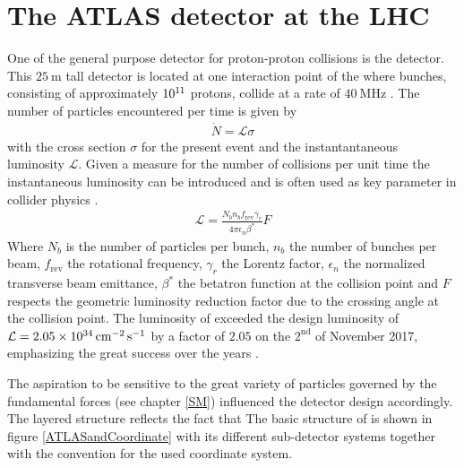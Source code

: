 \section{The ATLAS detector at the LHC}\label{ATLAS}
One of the general purpose detector for proton-proton collisions is the {\ATLAS} detector. This $\SI{25}{\meter}$ tall detector is located at one interaction point of the {\LHC} where bunches, consisting of approximately $\SI{E11}{}$ protons, collide at a rate of $\SI{40}{\mega\hertz}$ \cite{ATLASJINST}. The number of particles encountered per time is given by \cite{Perkins}
\begin{align}
                        \dot{N}=\mathcal{L}\sigma
\end{align}
with the cross section $\sigma$ for the present event and the instantantaneous luminosity $\mathcal{L}$. Given a measure for the number of collisions per unit time the instantaneous luminosity can be introduced and is often used as key parameter in collider physics \cite{LHCJINST}.
\begin{align}
                        \mathcal{L}=\frac{N_bn_bf_{\text{rev}}\gamma_r}{4\pi\epsilon_n\beta^*}F
\label{Lumi}
\end{align}
Where $N_b$ is the number of particles per bunch, $n_b$ the number of bunches per beam, $f_{\text{rev}}$ the rotational frequency, $\gamma_r$ the Lorentz factor, $\epsilon_n$ the normalized transverse beam emittance, $\beta^*$ the betatron function at the collision point and $F$ respects the geometric luminosity reduction factor due to the crossing angle at the collision point. The luminosity of {\ATLAS} exceeded the design luminosity of $\mathcal{L}=\SI{2.05E34}{\per\square\centi\meter\per\second}$ by a factor of $2.05$ on the $2^{\text{nd}}$ of November 2017, emphasizing the great success over the years \cite{designLumiExceeded}.\par 
The aspiration to be sensitive to the great variety of particles governed by the fundamental forces (see chapter \ref{SM}) influenced the detector design accordingly. The layered structure reflects the fact that
The basic structure of {\ATLAS} is shown in figure \ref{ATLASandCoordinate} with its different sub-detector systems together with the convention for the used coordinate system.  %
%
